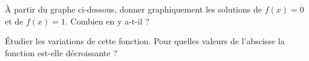
\begin{exercice}\label{exoSeconde-0047}

    À partir du graphe ci-dessous, donner graphiquement les solutions de \( f(x)=0\) et de  \( f(x)=1\). Combien en y a-t-il ?
%
    \begin{center}
   
    \end{center}

    Étudier les variations de cette fonction. Pour quelles valeurs de l'abscisse la fonction est-elle décroissante ?

\end{exercice}
